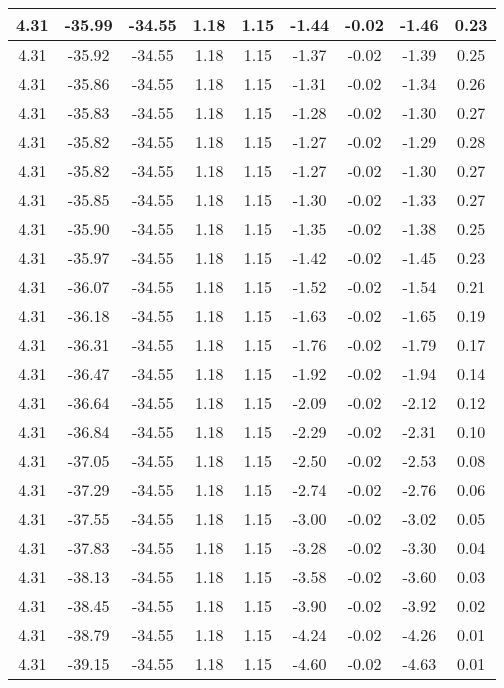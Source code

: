 \begin{table}[htbp]
\begin{adjustbox}{angle=90}
\begin{tabular}{|c|c|c|c|c|c|c|c|c|}
 4.31 & -35.99 & -34.55 & 1.18 & 1.15 & -1.44 & -0.02 & -1.46 & 0.23\\ \hline
 4.31 & -35.92 & -34.55 & 1.18 & 1.15 & -1.37 & -0.02 & -1.39 & 0.25\\ \hline
 4.31 & -35.86 & -34.55 & 1.18 & 1.15 & -1.31 & -0.02 & -1.34 & 0.26\\ \hline
 4.31 & -35.83 & -34.55 & 1.18 & 1.15 & -1.28 & -0.02 & -1.30 & 0.27\\ \hline
 4.31 & -35.82 & -34.55 & 1.18 & 1.15 & -1.27 & -0.02 & -1.29 & 0.28\\ \hline
 4.31 & -35.82 & -34.55 & 1.18 & 1.15 & -1.27 & -0.02 & -1.30 & 0.27\\ \hline
 4.31 & -35.85 & -34.55 & 1.18 & 1.15 & -1.30 & -0.02 & -1.33 & 0.27\\ \hline
 4.31 & -35.90 & -34.55 & 1.18 & 1.15 & -1.35 & -0.02 & -1.38 & 0.25\\ \hline
 4.31 & -35.97 & -34.55 & 1.18 & 1.15 & -1.42 & -0.02 & -1.45 & 0.23\\ \hline
 4.31 & -36.07 & -34.55 & 1.18 & 1.15 & -1.52 & -0.02 & -1.54 & 0.21\\ \hline
 4.31 & -36.18 & -34.55 & 1.18 & 1.15 & -1.63 & -0.02 & -1.65 & 0.19\\ \hline
 4.31 & -36.31 & -34.55 & 1.18 & 1.15 & -1.76 & -0.02 & -1.79 & 0.17\\ \hline
 4.31 & -36.47 & -34.55 & 1.18 & 1.15 & -1.92 & -0.02 & -1.94 & 0.14\\ \hline
 4.31 & -36.64 & -34.55 & 1.18 & 1.15 & -2.09 & -0.02 & -2.12 & 0.12\\ \hline
 4.31 & -36.84 & -34.55 & 1.18 & 1.15 & -2.29 & -0.02 & -2.31 & 0.10\\ \hline
 4.31 & -37.05 & -34.55 & 1.18 & 1.15 & -2.50 & -0.02 & -2.53 & 0.08\\ \hline
 4.31 & -37.29 & -34.55 & 1.18 & 1.15 & -2.74 & -0.02 & -2.76 & 0.06\\ \hline
 4.31 & -37.55 & -34.55 & 1.18 & 1.15 & -3.00 & -0.02 & -3.02 & 0.05\\ \hline
 4.31 & -37.83 & -34.55 & 1.18 & 1.15 & -3.28 & -0.02 & -3.30 & 0.04\\ \hline
 4.31 & -38.13 & -34.55 & 1.18 & 1.15 & -3.58 & -0.02 & -3.60 & 0.03\\ \hline
 4.31 & -38.45 & -34.55 & 1.18 & 1.15 & -3.90 & -0.02 & -3.92 & 0.02\\ \hline
 4.31 & -38.79 & -34.55 & 1.18 & 1.15 & -4.24 & -0.02 & -4.26 & 0.01\\ \hline
 4.31 & -39.15 & -34.55 & 1.18 & 1.15 & -4.60 & -0.02 & -4.63 & 0.01\\ \hline

\end{tabular}
\end{adjustbox}
\end{table}
